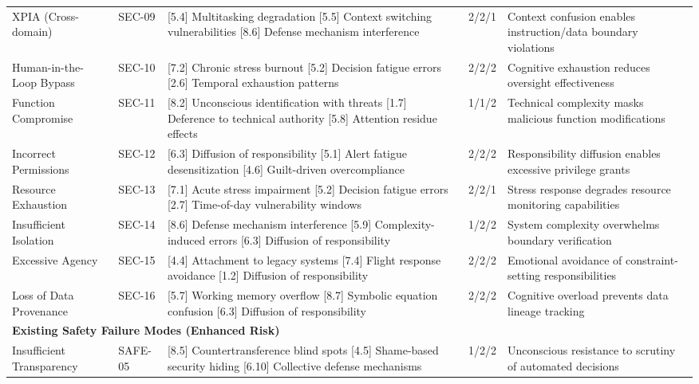 \documentclass[11pt,a4paper]{article}
\begin{document}
\begin{center}
\begin{longtable}{p{3cm}p{1.5cm}p{4cm}p{1cm}p{4cm}}
XPIA (Cross-domain) & SEC-09 & [5.4] Multitasking degradation
[5.5] Context switching vulnerabilities
[8.6] Defense mechanism interference & 2/2/1 & Context confusion enables instruction/data boundary violations \\

Human-in-the-Loop Bypass & SEC-10 & [7.2] Chronic stress burnout
[5.2] Decision fatigue errors
[2.6] Temporal exhaustion patterns & 2/2/2 & Cognitive exhaustion reduces oversight effectiveness \\

Function Compromise & SEC-11 & [8.2] Unconscious identification with threats
[1.7] Deference to technical authority
[5.8] Attention residue effects & 1/1/2 & Technical complexity masks malicious function modifications \\

Incorrect Permissions & SEC-12 & [6.3] Diffusion of responsibility
[5.1] Alert fatigue desensitization
[4.6] Guilt-driven overcompliance & 2/2/2 & Responsibility diffusion enables excessive privilege grants \\

Resource Exhaustion & SEC-13 & [7.1] Acute stress impairment
[5.2] Decision fatigue errors
[2.7] Time-of-day vulnerability windows & 2/2/1 & Stress response degrades resource monitoring capabilities \\

Insufficient Isolation & SEC-14 & [8.6] Defense mechanism interference
[5.9] Complexity-induced errors
[6.3] Diffusion of responsibility & 1/2/2 & System complexity overwhelms boundary verification \\

Excessive Agency & SEC-15 & [4.4] Attachment to legacy systems
[7.4] Flight response avoidance
[1.2] Diffusion of responsibility & 2/2/2 & Emotional avoidance of constraint-setting responsibilities \\

Loss of Data Provenance & SEC-16 & [5.7] Working memory overflow
[8.7] Symbolic equation confusion
[6.3] Diffusion of responsibility & 2/2/2 & Cognitive overload prevents data lineage tracking \\

\midrule
\multicolumn{5}{l}{\textbf{Existing Safety Failure Modes (Enhanced Risk)}} \\
\midrule

Insufficient Transparency & SAFE-05 & [8.5] Countertransference blind spots
[4.5] Shame-based security hiding
[6.10] Collective defense mechanisms & 1/2/2 & Unconscious resistance to scrutiny of automated decisions \\


\end{longtable}
\end{center}
\end{document}
